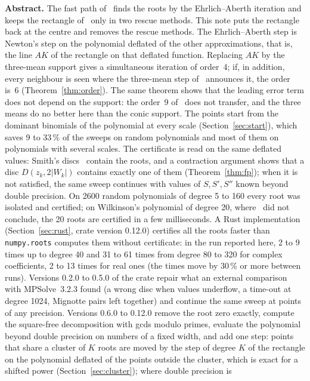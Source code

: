 \documentclass[10pt,a4paper]{article}
\theoremstyle{definition}
\numberwithin{equation}{section}
\begin{document}
\textbf{Abstract.}
The fast path of~\cite{g7} finds the roots by the Ehrlich--Aberth iteration and keeps the rectangle
of~\cite{v29} only in two rescue methods. This note puts the rectangle back at the centre and removes
the rescue methods. The Ehrlich--Aberth step is Newton's step on the polynomial deflated of the other
approximations, that is, the line $AK$ of the rectangle on that deflated function. Replacing $AK$ by
the three-mean support gives a simultaneous iteration of order~4; if, in addition, every neighbour is
seen where the three-mean step of~\cite{g2} announces it, the order is~6
(Theorem~\ref{thm:order}). The same theorem shows that the leading error term does not depend on the
support: the order~9 of~\cite{v29} does not transfer, and the three means do no better here than the
conic support. The points start from the dominant binomials of the polynomial at every scale
(Section~\ref{sec:start}), which saves 9 to 33\,\% of the sweeps on random polynomials and most of
them on polynomials with several scales. The certificate is read on the same deflated values: Smith's
discs~\cite{smith} contain the roots, and a contraction argument shows that a disc $D(z_k,2|W_k|)$
contains exactly one of them (Theorem~\ref{thm:fp}); when it is not satisfied, the same sweep continues
with values of $S,S',S''$ known beyond double precision. On 2600 random polynomials of degree 5 to 160
every root was isolated and certified; on Wilkinson's polynomial of degree 20, where~\cite{g7} did not
conclude, the 20 roots are certified in a few milliseconds. A Rust implementation
(Section~\ref{sec:rust}, crate version 0.12.0) certifies all the roots faster than \texttt{numpy.roots}
computes them without certificate: in the run reported here, 2 to 9 times up to degree 40 and 31 to 61
times from degree 80 to 320 for complex coefficients, 2 to 13 times for real ones (the times move by
30\,\% or more between runs).
Versions 0.2.0 to 0.5.0 of the crate repair what an external comparison with MPSolve~3.2.3 found
(a wrong disc when values underflow, a time-out at degree 1024, Mignotte pairs left together) and
continue the same sweep at points of any precision. Versions 0.6.0 to 0.12.0 remove the root zero
exactly, compute the square-free decomposition with gcds modulo primes, evaluate the polynomial beyond
double precision on numbers of a fixed width, and add one step: points that share a cluster of $K$ roots
are moved by the step of degree $K$ of the rectangle on the polynomial deflated of the points outside
the cluster, which is exact for a shifted power (Section~\ref{sec:cluster}); where double precision is
\end{document}
